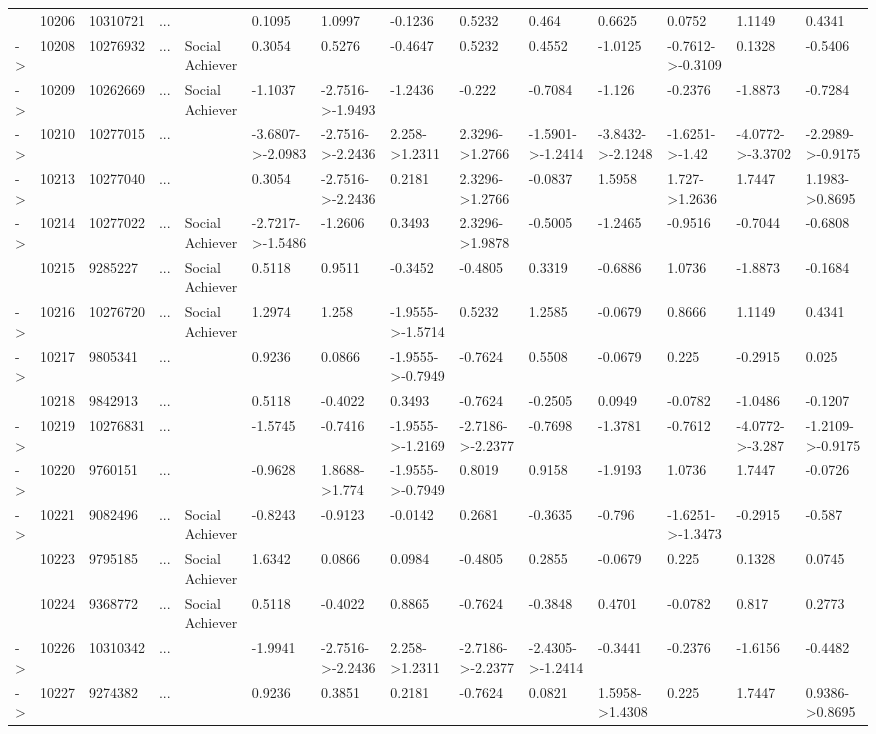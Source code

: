 \documentclass[6pt]{article}
\begin{document}
\begin{landscape}
{\begin{longtable}{llllllllllllll}
&10206&10310721&...&&0.1095&1.0997&-0.1236&0.5232&0.464&0.6625&0.0752&1.1149&0.4341\tabularnewline
-\textgreater &10208&10276932&...&Social Achiever&0.3054&0.5276&-0.4647&0.5232&0.4552&-1.0125&-0.7612-\textgreater -0.3109&0.1328&-0.5406\tabularnewline
-\textgreater &10209&10262669&...&Social Achiever&-1.1037&-2.7516-\textgreater -1.9493&-1.2436&-0.222&-0.7084&-1.126&-0.2376&-1.8873&-0.7284\tabularnewline
-\textgreater &10210&10277015&...&&-3.6807-\textgreater -2.0983&-2.7516-\textgreater -2.2436&2.258-\textgreater 1.2311&2.3296-\textgreater 1.2766&-1.5901-\textgreater -1.2414&-3.8432-\textgreater -2.1248&-1.6251-\textgreater -1.42&-4.0772-\textgreater -3.3702&-2.2989-\textgreater -0.9175\tabularnewline
-\textgreater &10213&10277040&...&&0.3054&-2.7516-\textgreater -2.2436&0.2181&2.3296-\textgreater 1.2766&-0.0837&1.5958&1.727-\textgreater 1.2636&1.7447&1.1983-\textgreater 0.8695\tabularnewline
-\textgreater &10214&10277022&...&Social Achiever&-2.7217-\textgreater -1.5486&-1.2606&0.3493&2.3296-\textgreater 1.9878&-0.5005&-1.2465&-0.9516&-0.7044&-0.6808\tabularnewline
&10215&9285227&...&Social Achiever&0.5118&0.9511&-0.3452&-0.4805&0.3319&-0.6886&1.0736&-1.8873&-0.1684\tabularnewline
-\textgreater &10216&10276720&...&Social Achiever&1.2974&1.258&-1.9555-\textgreater -1.5714&0.5232&1.2585&-0.0679&0.8666&1.1149&0.4341\tabularnewline
-\textgreater &10217&9805341&...&&0.9236&0.0866&-1.9555-\textgreater -0.7949&-0.7624&0.5508&-0.0679&0.225&-0.2915&0.025\tabularnewline
&10218&9842913&...&&0.5118&-0.4022&0.3493&-0.7624&-0.2505&0.0949&-0.0782&-1.0486&-0.1207\tabularnewline
-\textgreater &10219&10276831&...&&-1.5745&-0.7416&-1.9555-\textgreater -1.2169&-2.7186-\textgreater -2.2377&-0.7698&-1.3781&-0.7612&-4.0772-\textgreater -3.287&-1.2109-\textgreater -0.9175\tabularnewline
-\textgreater &10220&9760151&...&&-0.9628&1.8688-\textgreater 1.774&-1.9555-\textgreater -0.7949&0.8019&0.9158&-1.9193&1.0736&1.7447&-0.0726\tabularnewline
-\textgreater &10221&9082496&...&Social Achiever&-0.8243&-0.9123&-0.0142&0.2681&-0.3635&-0.796&-1.6251-\textgreater -1.3473&-0.2915&-0.587\tabularnewline
&10223&9795185&...&Social Achiever&1.6342&0.0866&0.0984&-0.4805&0.2855&-0.0679&0.225&0.1328&0.0745\tabularnewline
&10224&9368772&...&Social Achiever&0.5118&-0.4022&0.8865&-0.7624&-0.3848&0.4701&-0.0782&0.817&0.2773\tabularnewline
\newpage
-\textgreater &10226&10310342&...&&-1.9941&-2.7516-\textgreater -2.2436&2.258-\textgreater 1.2311&-2.7186-\textgreater -2.2377&-2.4305-\textgreater -1.2414&-0.3441&-0.2376&-1.6156&-0.4482\tabularnewline
-\textgreater &10227&9274382&...&&0.9236&0.3851&0.2181&-0.7624&0.0821&1.5958-\textgreater 1.4308&0.225&1.7447&0.9386-\textgreater 0.8695\tabularnewline

\end{longtable}}
\end{landscape}
\end{document}
